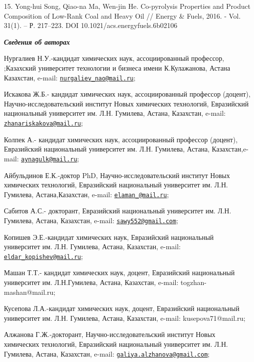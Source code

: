 15. Yong-hui Song, Qiao-na Ma, Wen-jin He. Co-pyrolysis Properties and
Product Composition of Low-Rank Coal and Heavy Oil // Energy \& Fuels,
2016. - Vol. 31(1). -- Р. 217--223. DOI 10.1021/acs.energyfuels.6b02106

\emph{{\bfseries Сведения об авторах}}

Нургалиев Н.У.-кандидат химических наук, ассоциированный профессор,
;Казахский университет технологии и бизнеса имени К.Кулажанова, Астана
Казахстан, e-mail:
\href{mailto:nurgaliev_nao@mail.ru}{\nolinkurl{nurgaliev\_nao@mail.ru}};

Искакова Ж.Б.- кандидат химических наук, ассоциированный профессор
(доцент), Научно-исследовательский институт Новых химических технологий,
Евразийский национальный университет им. Л.Н. Гумилева, Астана,
Казахстан, e-mail:
\href{mailto:zhanariskakova@mail.ru}{\nolinkurl{zhanariskakova@mail.ru}};

Колпек А.- кандидат химических наук, ассоциированный профессор (доцент),
Евразийский национальный университет им. Л.Н. Гумилева, Астана,
Казахстан,e-mail:
\href{mailto:aynagulk@mail.ru}{\nolinkurl{aynagulk@mail.ru}};

Айбульдинов Е.К.-доктор PhD, Научно-исследовательский институт Новых
химических технологий, Евразийский национальный университет им. Л.Н.
Гумилева, Астана,Казахстан, e-mail:
\href{mailto:elaman_@mail.ru}{\nolinkurl{elaman\_@mail.ru}};

Сабитов А.С.- докторант, Евразийский национальный университет им. Л.Н.
Гумилева, Астана, Казахстан, e-mail:
\href{mailto:sawy552@gmail.com}{\nolinkurl{sawy552@gmail.com}};

Копишев Э.Е.-кандидат химических наук, Евразийский национальный
университет им. Л.Н. Гумилева, Астана, Казахстан, e-mail:
\href{mailto:eldar_kopishev@mail.ru}{\nolinkurl{eldar\_kopishev@mail.ru}};

Машан Т.Т.- кандидат химических наук, доцент, Евразийский национальный
университет им. Л.Н.Гумилева, Астана, Казахстан, e-mail:
togzhan-mashan@mail.ru;

Кусепова Л.А.-кандидат химических наук, доцент, Евразийский национальный
университет им. Л.Н. Гумилева, Астана, Казахстан, e-mail:
kusepova71@mail.ru;

Алжанова Г.Ж.-докторант, Научно-исследовательский институт Новых
химических технологий, Евразийский национальный университет им. Л.Н.
Гумилева, Астана, Казахстан, e-mail:
\href{mailto:galiya.alzhanova@gmail.com}{\nolinkurl{galiya.alzhanova@gmail.com}};

